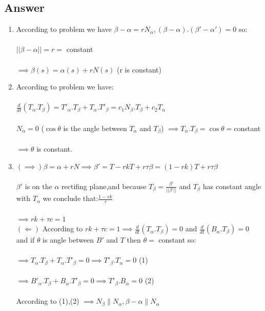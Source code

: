 \documentclass[
	12pt, %
]{fphw}
\theoremstyle{plain}
\begin{document}
\subsection*{Answer}
\begin{enumerate}
     \item According to problem we have $\beta - \alpha = rN_\alpha , (\beta - \alpha).(\beta' - \alpha') = 0$ so:\\
       \\$||\beta - \alpha|| = r =$ constant\\  \\$\implies \beta(s) = \alpha(s) + rN(s)$ (r is constant)\\
     \item According to problem we have:\\  \\ $\frac{d}{dt}(T_\alpha.T_\beta) = T'_\alpha.T_\beta + T_\alpha.T'_\beta = c_1 N_\beta.T_\beta + c_2 T_\alpha$\\
       \\$N_\alpha = 0$ ($\cos \theta$ is the angle between $T_\alpha$ and $T_\beta$) $\implies T_\alpha.T_\beta = \cos \theta =$constant\\  \\$\implies \theta$ is constant.\\
     \item $(\implies) \beta = \alpha + rN \implies \beta' = T - rkT + r\tau \beta = (1 - rk)T + r\tau \beta$\\
       \\$\beta'$ is on the $\alpha$ rectifing plane,and because $T_\beta = \frac{\beta'}{||\beta'||}$ and $T_\beta$ has constant angle with $T_\alpha$ we conclude that:$\frac{1-rk}{\tau}$\\
       \\$\implies rk + \tau c = 1$
       \\$(\Longleftarrow)$ According to $ rk + \tau c = 1 \implies \frac{d}{dt}(T_\alpha.T_\beta) = 0$ and $ \frac{d}{dt}(B_\alpha.T_\beta) = 0$ and if $\theta$ is angle between $B'$ and $T$ then $\theta =$ constant so:\\
       \\$\implies T_\alpha.T_\beta + T_\alpha.T'_\beta = 0  \implies T'_\beta.T_\alpha = 0$ (1)\\
       \\$\implies B'_\alpha.T_\beta + B_\alpha.T'_\beta = 0  \implies T'_\beta.B_\alpha = 0$ (2)\\
       \\ According to (1),(2) $\implies N_\beta \parallel N_\alpha, \beta - \alpha \parallel N_\alpha$\\

\end{enumerate}
\end{document}
